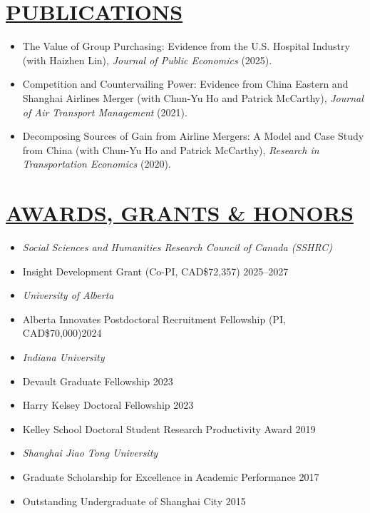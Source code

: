 \documentclass{res}
\begin{document}
\begin{resume}
\section{\large{\ul{PUBLICATIONS}}}
\vspace{1.8em}
\begin{itemize}[leftmargin=15pt,labelindent=-15pt,itemindent=-15pt,itemsep=0.1em]
    \item[] The Value of Group Purchasing: Evidence from the U.S. Hospital Industry (with Haizhen Lin), \textit{Journal of Public Economics} (2025).
    \item[] Competition and Countervailing Power: Evidence from China Eastern and Shanghai Airlines Merger (with Chun-Yu Ho and Patrick McCarthy), \textit{Journal of Air Transport Management} (2021).
    \item[] Decomposing Sources of Gain from Airline Mergers: A Model and Case Study from China (with Chun-Yu Ho and Patrick McCarthy), \textit{Research in Transportation Economics} (2020).
\end{itemize}

\section{\large{\ul{AWARDS, GRANTS \& HONORS}}}
\vspace{1.8em}
\begin{itemize}[leftmargin=15pt,labelindent=-15pt,itemindent=-15pt,itemsep=0.1em]
  \item[] \textit{Social Sciences and Humanities Research Council of Canada (SSHRC)}
      \item[] \hspace{13pt} Insight Development Grant (Co-PI, CAD\$72,357) \hfill 2025--2027
\item[] \textit{University of Alberta}
    \item[] \hspace{13pt} Alberta Innovates Postdoctoral Recruitment Fellowship (PI, CAD\$70,000)\hfill 2024
\item[] \textit{Indiana University}
    \item[] \hspace{13pt} Devault Graduate Fellowship \hfill 2023
    \item[] \hspace{13pt} Harry Kelsey Doctoral Fellowship \hfill 2023
    \item[] \hspace{13pt} Kelley School Doctoral Student Research Productivity Award \hfill 2019
\item[] \textit{Shanghai Jiao Tong University}
    \item[] \hspace{13pt} Graduate Scholarship for Excellence in Academic Performance \hfill 2017
    \item[] \hspace{13pt} Outstanding Undergraduate of Shanghai City \hfill 2015
\end{itemize}


\end{resume}
\end{document}
